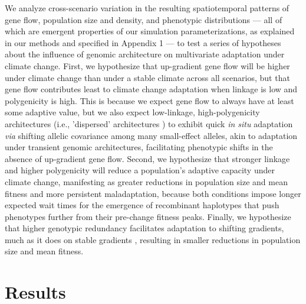 \documentclass[9pt,twocolumn,twoside,lineno]{pnas-new}
\begin{document}
We analyze cross-scenario variation in the resulting spatiotemporal
patterns of gene flow, population size and density, and phenotypic
distributions --- all of which are emergent properties of our simulation
parameterizations, as explained in our methods
and specified in Appendix 1 --- 
to test a series of hypotheses about the influence of genomic architecture 
on multivariate adaptation under climate change. First, we hypothesize that up-gradient 
gene flow will be higher under climate change than under a stable climate across all
scenarios, but that gene flow contributes least to climate change adaptation when
linkage is low and polygenicity is high.
This is because we expect gene flow to always have
at least some adaptive value, but we also expect low-linkage, high-polygenicity architectures 
(i.e., 'dispersed' architectures \cite{yeaman_review}) to exhibit quick \textit{in situ}
adaptation \textit{via} shifting allelic covariance among many small-effect alleles, akin to adaptation 
under transient genomic architectures, facilitating phenotypic shifts in the absence of up-gradient gene flow.
Second, we hypothesize that stronger linkage 
and higher polygenicity will reduce a population's adaptive capacity under climate change,
manifesting as greater reductions in population size and mean fitness
and more persistent maladaptation, because both conditions impose longer expected
wait times for the emergence of recombinant haplotypes that push phenotypes
further from their pre-change fitness peaks. Finally, we hypothesize that higher genotypic redundancy
facilitates adaptation to shifting gradients, much as it does on stable gradients 
\cite{barghi_redundancy,manceau,yeaman_amnat}, resulting in smaller reductions 
in population size and mean fitness.


\section*{Results}
\end{document}
